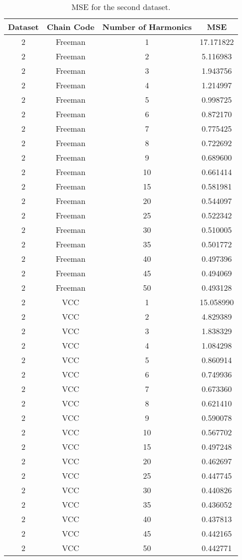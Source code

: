\documentclass[thesis.tex]{subfiles}
\begin{document}
\begin{table}
\centering
 \begin{tabular}{c c c c} 
 \toprule
 Dataset &  Chain Code & Number of Harmonics & MSE\\ [0.5ex] 
 \midrule
2 & Freeman & 1  & 17.171822 \\
2 & Freeman & 2  & 5.116983  \\
2 & Freeman & 3  & 1.943756  \\
2 & Freeman & 4  & 1.214997  \\
2 & Freeman & 5  & 0.998725  \\
2 & Freeman & 6  & 0.872170  \\
2 & Freeman & 7  & 0.775425  \\
2 & Freeman & 8  & 0.722692  \\
2 & Freeman & 9  & 0.689600  \\
2 & Freeman & 10 & 0.661414  \\
2 & Freeman & 15 & 0.581981  \\
2 & Freeman & 20 & 0.544097  \\
2 & Freeman & 25 & 0.522342  \\
2 & Freeman & 30 & 0.510005  \\
2 & Freeman & 35 & 0.501772  \\
2 & Freeman & 40 & 0.497396  \\
2 & Freeman & 45 & 0.494069  \\
2 & Freeman & 50 & 0.493128  \\
2 & VCC & 1  & 15.058990 \\
2 & VCC & 2  & 4.829389  \\
2 & VCC & 3  & 1.838329  \\
2 & VCC & 4  & 1.084298  \\
2 & VCC & 5  & 0.860914  \\
2 & VCC & 6  & 0.749936  \\
2 & VCC & 7  & 0.673360  \\
2 & VCC & 8  & 0.621410  \\
2 & VCC & 9  & 0.590078  \\
2 & VCC & 10 & 0.567702  \\
2 & VCC & 15 & 0.497248  \\
2 & VCC & 20 & 0.462697  \\
2 & VCC & 25 & 0.447745  \\
2 & VCC & 30 & 0.440826  \\
2 & VCC & 35 & 0.436052  \\
2 & VCC & 40 & 0.437813  \\
2 & VCC & 45 & 0.442165  \\
2 & VCC & 50 & 0.442771 \\
\bottomrule
\end{tabular}
\caption{MSE for the second dataset.}
\label{mse_2}
\end{table}
\end{document}
